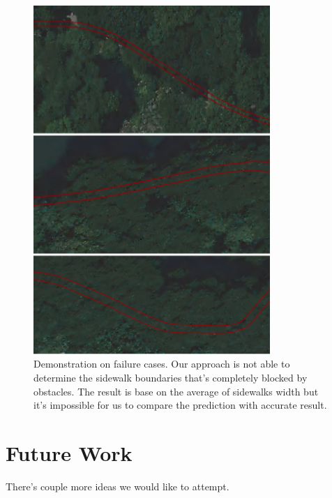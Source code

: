\begin{figure}
    \centering
    \includegraphics[width=0.8\textwidth]{Figures/ny_failcase.png}
    \caption[Failure Case 3]{Demonstration on failure cases. Our approach is not able to determine the sidewalk boundaries that's completely blocked by obstacles. The result is base on the average of sidewalks width but it's impossible for us to compare the prediction with accurate result.}
    \label{fig:ny_fail_1}
\end{figure} 

\section{Future Work}

There's couple more ideas we would like to attempt.

